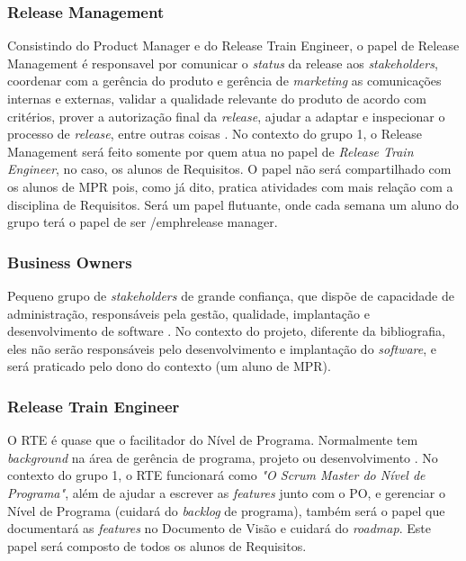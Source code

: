 \subsubsection{Release Management}
Consistindo do Product Manager e do Release Train Engineer, o papel de Release Management é responsavel por comunicar o \emph{status} da release aos \emph{stakeholders}, coordenar com a gerência do produto e gerência de \emph{marketing} as comunicações internas e externas, validar a qualidade relevante do produto de acordo com critérios, prover a autorização final da \emph{release}, ajudar a adaptar e inspecionar o processo de \emph{release}, entre outras coisas \cite{safesite001}.
No contexto do grupo 1, o Release Management será feito somente por quem atua no papel de \emph{Release Train Engineer}, no caso, os alunos de Requisitos. O papel não será compartilhado com os alunos de MPR pois, como já dito, pratica atividades com mais relação com a disciplina de Requisitos. Será um papel flutuante, onde cada semana um aluno do grupo terá o papel de ser /emph{release manager}.

\subsubsection{Business Owners}
Pequeno grupo de \emph{stakeholders} de grande confiança, que dispõe de capacidade de administração, responsáveis pela gestão, qualidade, implantação e desenvolvimento de software \cite{safesite001}. No contexto do projeto, diferente da bibliografia, eles não serão responsáveis pelo desenvolvimento e implantação do \emph{software}, e será praticado pelo dono do contexto (um aluno de MPR).

\subsubsection{Release Train Engineer}
O RTE é quase que o facilitador do Nível de Programa. Normalmente tem \emph{background} na área de gerência de programa, projeto ou desenvolvimento \cite{safesite005}. No contexto do grupo 1, o RTE funcionará como \emph{"O Scrum Master do Nível de Programa"}, além de ajudar a escrever as \emph{features} junto com o PO, e gerenciar o Nível de Programa (cuidará do \emph{backlog} de programa), também será o papel que documentará as \emph{features} no Documento de Visão e cuidará do \emph{roadmap}. Este papel será composto de todos os alunos de Requisitos.


